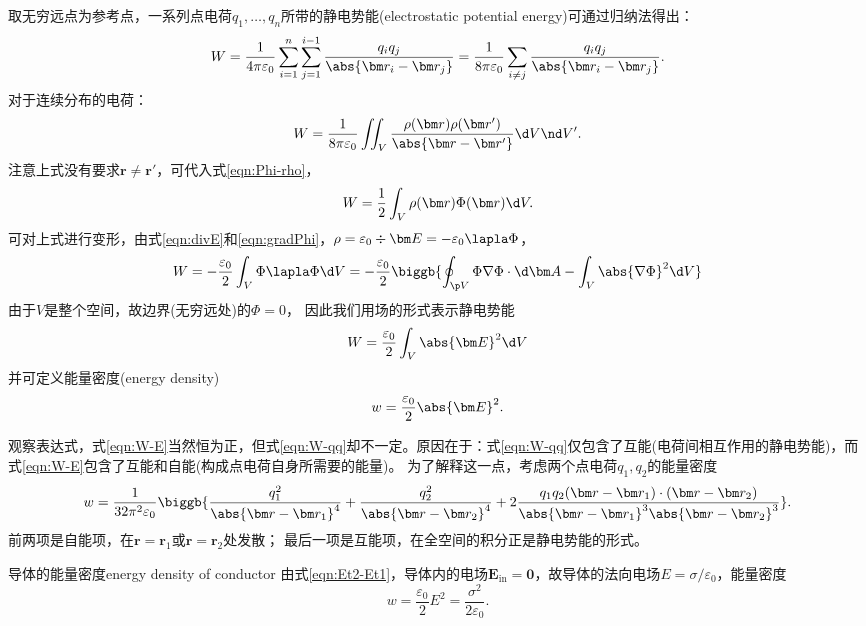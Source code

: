 取无穷远点为参考点，一系列点电荷$q_1,\ldots,q_n$所带的静电势能(electrostatic potential energy)可通过归纳法得出：
\begin{equation}
    W=\frac1{4\pi\varepsilon_0}\sum_{i=1}^n\sum_{j=1}^{i-1}\frac{q_iq_j}{\abs{\bm r_i-\bm r_j}}=\frac1{8\pi\varepsilon_0}\sum_{i\neq j}\frac{q_iq_j}{\abs{\bm r_i-\bm r_j}}.
\end{equation}
对于连续分布的电荷：
\begin{equation*}
    \label{eqn:W-qq}
    W=\frac1{8\pi\varepsilon_0}\iint_V\frac{\rho(\bm r)\rho(\bm r')}{\abs{\bm r-\bm r'}}\d V\nd V'.
\end{equation*}
注意上式没有要求$\bm r\neq\bm r'$，可代入式\eqref{eqn:Phi-rho}，
\begin{equation}
    \label{eqn:W-rhoPhi}
    W=\frac12\int_V\rho(\bm r)\Phi(\bm r)\d V.
\end{equation}
可对上式进行变形，由式\eqref{eqn:divE}和\eqref{eqn:gradPhi}，$\rho=\varepsilon_0\div\bm E=-\varepsilon_0\lapla\Phi$，
\begin{equation*}
    W=-\frac{\varepsilon_0}2\int_V\Phi\lapla\Phi\d V=-\frac{\varepsilon_0}2\biggb{\oint_{\p V}\Phi\nabla\Phi\cdot\d\bm A-\int_V\abs{\nabla\Phi}^2\d V}
\end{equation*}
由于$V$是整个空间，故边界(无穷远处)的$\Phi=0$，
因此我们用场的形式表示静电势能
\begin{equation}
    \label{eqn:W-E}
    W=\frac{\varepsilon_0}2\int_V\abs{\bm E}^2\d V
\end{equation}
并可定义能量密度(energy density)
\begin{equation}
    w=\frac{\varepsilon_0}2\abs{\bm E}^2.
\end{equation}

观察表达式，式\eqref{eqn:W-E}当然恒为正，但式\eqref{eqn:W-qq}却不一定。原因在于：式\eqref{eqn:W-qq}仅包含了互能(电荷间相互作用的静电势能)，而式\eqref{eqn:W-E}包含了互能和自能(构成点电荷自身所需要的能量)。
为了解释这一点，考虑两个点电荷$q_1,q_2$的能量密度
\[
    w=\frac1{32\pi^2\varepsilon_0}\biggb{\frac{q_1^2}{\abs{\bm r-\bm r_1}^4}+\frac{q_2^2}{\abs{\bm r-\bm r_2}^4}+2\frac{q_1q_2(\bm r-\bm r_1)\cdot(\bm r-\bm r_2)}{\abs{\bm r-\bm r_1}^3\abs{\bm r-\bm r_2}^3}}.
\]
前两项是自能项，在$\bm r=\bm r_1$或$\bm r=\bm r_2$处发散；
最后一项是互能项，在全空间的积分正是静电势能的形式。

\begin{example}{导体的能量密度}{energy density of conductor}
    由式\eqref{eqn:Et2-Et1}，导体内的电场$\bm E_\text{in}=\bm 0$，故导体的法向电场$E=\sigma/\varepsilon_0$，能量密度
    \[
        w=\frac{\varepsilon_0}2E^2=\frac{\sigma^2}{2\varepsilon_0}.
    \]
\end{example}

